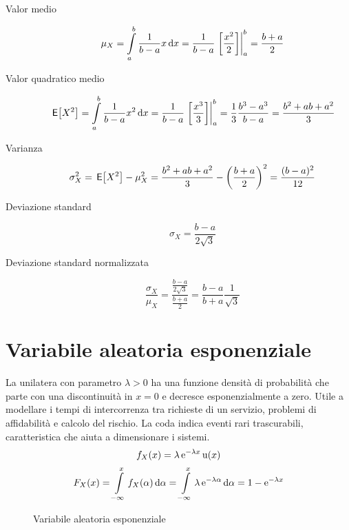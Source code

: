 \begin{description}
\item[Valor medio]\[\mu_X=\intd{a}{b}{\frac{1}{b-a}x}{x}=\frac{1}{b-a}\bound{a}{b}{\frac{x^2}{2}}=\frac{b+a}{2}\]
\item[Valor quadratico medio] \[\E{X^2}=\intd{a}{b}{\frac{1}{b-a}x^2}{x}=\frac{1}{b-a}\bound{a}{b}{\frac{x^3}{3}}=\frac{1}{3}\frac{b^3-a^3}{b-a}=\frac{b^2+a b+a^2}{3}\]
\item[Varianza]\[\sigma^2_X=\E{X^2}-\mu^2_X=\frac{b^2+a b+a^2}{3}-\left(\frac{b+a}{2}\right)^2=\frac{(b-a)^2}{12}\]
\item[Deviazione standard]\[\sigma_X=\frac{b-a}{2\sqrt{3}}\]
\item[Deviazione standard normalizzata]\[\frac{\sigma_X}{\mu_X}=\frac{\frac{b-a}{2\sqrt{3}}}{\frac{b+a}{2}}=\frac{b-a}{b+a}\frac{1}{\sqrt{3}}\]
\end{description}

\section{Variabile aleatoria esponenziale}
La  unilatera con parametro $\lambda>0$ ha una funzione densità di probabilità che parte con una discontinuità in $x=0$ e decresce esponenzialmente a zero. Utile a modellare i tempi di intercorrenza tra richieste di un servizio, problemi di affidabilità e calcolo del rischio. La coda indica eventi rari trascurabili, caratteristica che aiuta a dimensionare i sistemi.
\begin{equation}
f_X(x)=\lambda\e{-\lambda x}\step(x)
\end{equation}
\begin{equation}
F_X(x)=\intd{-\infty}{x}{f_X(\alpha)}{\alpha}=\intd{-\infty}{x}{\lambda\e{-\lambda \alpha}}{\alpha}=1-\e{-\lambda x}
\end{equation}
\begin{figure}[!ht]
	\centering
	 \qquad
	\caption{Variabile aleatoria esponenziale}
\end{figure}

